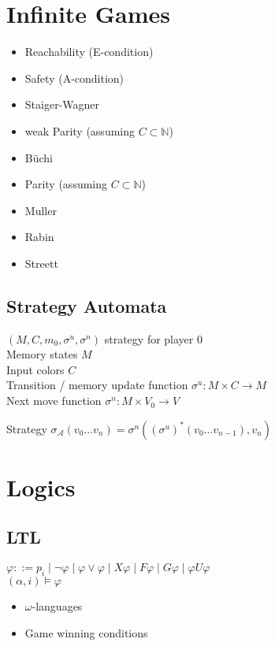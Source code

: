 \documentclass{article}
\begin{document}
\newpage
\section{Infinite Games}
\begin{itemize}
	\item Reachability (E-condition)
	\item Safety (A-condition)
	\item Staiger-Wagner
	\item weak Parity (assuming $C \subset \mathbb{N}$)
	\item Büchi
	\item Parity (assuming $C \subset \mathbb{N}$)
	\item Muller
	\item Rabin
	\item Streett 
\end{itemize}

\subsection{Strategy Automata}
$(M, C, m_0, \sigma^u, \sigma^n)$ strategy for player 0 \\
Memory states $M$ \\
Input colors $C$ \\
Transition / memory update function $\sigma^u : M \times C \rightarrow M$ \\
Next move function $\sigma^n : M \times V_0 \rightarrow V$

Strategy $\sigma_\mathcal{A}(v_0 \dots v_n) = \sigma^n((\sigma^u)^*(v_0 \dots v_{n-1}), v_n)$


\newpage
\section{Logics}
\subsection{LTL}
$\varphi ::= p_i \mid \neg \varphi \mid \varphi \lor \varphi \mid X \varphi \mid F \varphi \mid G \varphi \mid \varphi U \varphi$
\\
$(\alpha, i) \models \varphi$

\begin{itemize}
	\item $\omega$-languages
	\item Game winning conditions
\end{itemize}
\end{document}
